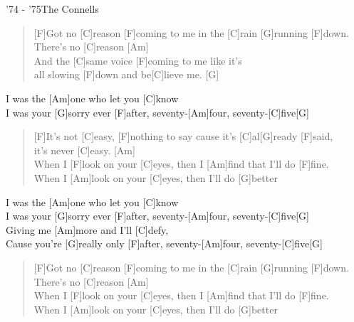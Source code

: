 \begin{song}{'74 - '75}{The Connells}

    \begin{verse}
        [F]Got no [C]reason [F]coming to me in the [C]rain [G]running [F]down. \\
        There's no [C]reason [Am] \\
        [F]And the [C]same voice [F]coming to me like it's \\
        [C]all slowing [F]down and be[C]lieve me. [G]
    \end{verse}

    \begin{chorus}
        I was the [Am]one who let you [C]know \\
        I was your [G]sorry ever [F]after, seventy-[Am]four, seventy-[C]five[G]
    \end{chorus}

    \begin{verse}
        [F]It's not [C]easy, [F]nothing to say cause it's [C]al[G]ready [F]said, \\
        it's never [C]easy. [Am] \\
        When I [F]look on your [C]eyes, then I [Am]find that I'll do [F]fine. \\
        When I [Am]look on your [C]eyes, then I'll do [G]better
    \end{verse}

    \begin{chorus}
        I was the [Am]one who let you [C]know \\
        I was your [G]sorry ever [F]after, seventy-[Am]four, seventy-[C]five[G] \\
        Giving me [Am]more and I'll [C]defy, \\
        Cause you're [G]really only [F]after, seventy-[Am]four, seventy-[C]five[G]
    \end{chorus}

    \begin{verse}
        [F]Got no [C]reason [F]coming to me in the [C]rain [G]running [F]down. \\
        There's no [C]reason [Am] \\
        When I [F]look on your [C]eyes, then I [Am]find that I'll do [F]fine. \\
        When I [Am]look on your [C]eyes, then I'll do [G]better
    \end{verse}

    
\end{song}
